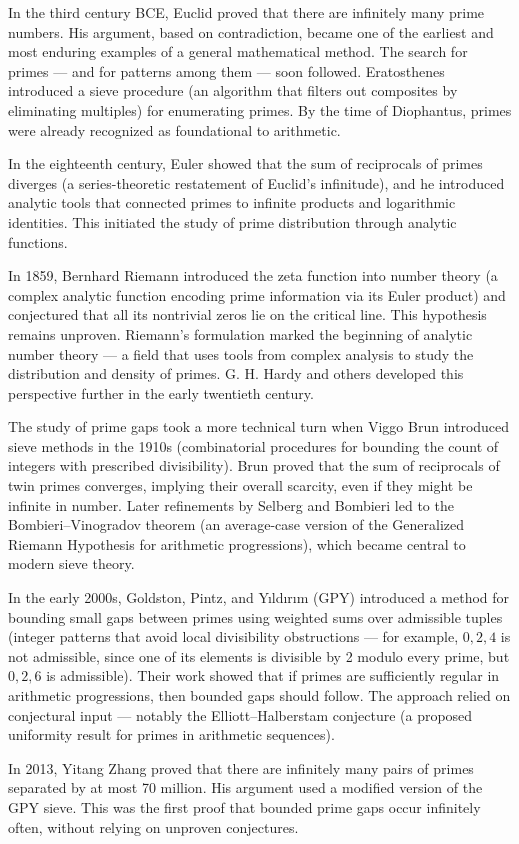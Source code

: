\begin{historical}
In the third century BCE, Euclid proved that there are infinitely many prime numbers. His argument, based on contradiction, became one of the earliest and most enduring examples of a general mathematical method. The search for primes — and for patterns among them — soon followed. Eratosthenes introduced a sieve procedure (an algorithm that filters out composites by eliminating multiples) for enumerating primes. By the time of Diophantus, primes were already recognized as foundational to arithmetic.

In the eighteenth century, Euler showed that the sum of reciprocals of primes diverges (a series-theoretic restatement of Euclid’s infinitude), and he introduced analytic tools that connected primes to infinite products and logarithmic identities. This initiated the study of prime distribution through analytic functions.

In 1859, Bernhard Riemann introduced the zeta function into number theory (a complex analytic function encoding prime information via its Euler product) and conjectured that all its nontrivial zeros lie on the critical line. This hypothesis remains unproven. Riemann’s formulation marked the beginning of analytic number theory — a field that uses tools from complex analysis to study the distribution and density of primes. G. H. Hardy and others developed this perspective further in the early twentieth century.

The study of prime gaps took a more technical turn when Viggo Brun introduced sieve methods in the 1910s (combinatorial procedures for bounding the count of integers with prescribed divisibility). Brun proved that the sum of reciprocals of twin primes converges, implying their overall scarcity, even if they might be infinite in number. Later refinements by Selberg and Bombieri led to the Bombieri–Vinogradov theorem (an average-case version of the Generalized Riemann Hypothesis for arithmetic progressions), which became central to modern sieve theory.

In the early 2000s, Goldston, Pintz, and Yıldırım (GPY) introduced a method for bounding small gaps between primes using weighted sums over admissible tuples (integer patterns that avoid local divisibility obstructions — for example, ${0, 2, 4}$ is not admissible, since one of its elements is divisible by 2 modulo every prime, but ${0, 2, 6}$ is admissible). Their work showed that if primes are sufficiently regular in arithmetic progressions, then bounded gaps should follow. The approach relied on conjectural input — notably the Elliott–Halberstam conjecture (a proposed uniformity result for primes in arithmetic sequences).

In 2013, Yitang Zhang proved that there are infinitely many pairs of primes separated by at most 70 million. His argument used a modified version of the GPY sieve. This was the first proof that bounded prime gaps occur infinitely often, without relying on unproven conjectures.
\end{historical}

